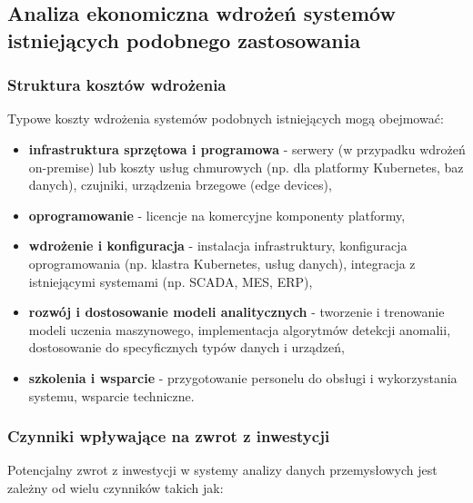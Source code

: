 \subsection{Analiza ekonomiczna wdrożeń systemów istniejących podobnego zastosowania}
\label{subsec:analiza_ekonomiczna}

\subsubsection{Struktura kosztów wdrożenia}
\label{subsubsec:struktura_kosztow}

Typowe koszty wdrożenia systemów podobnych istniejących mogą obejmować:

\begin{itemize}
    \item \textbf{infrastruktura sprzętowa i programowa} - serwery (w przypadku wdrożeń on-premise) lub koszty usług chmurowych (np. dla platformy Kubernetes, baz danych), czujniki, urządzenia brzegowe (edge devices),
    \item \textbf{oprogramowanie} - licencje na komercyjne komponenty platformy,
    \item \textbf{wdrożenie i konfiguracja} - instalacja infrastruktury, konfiguracja oprogramowania (np. klastra Kubernetes, usług danych), integracja z istniejącymi systemami (np. SCADA, MES, ERP),
    \item \textbf{rozwój i dostosowanie modeli analitycznych} - tworzenie i trenowanie modeli uczenia maszynowego, implementacja algorytmów detekcji anomalii, dostosowanie do specyficznych typów danych i urządzeń,
    \item \textbf{szkolenia i wsparcie} - przygotowanie personelu do obsługi i wykorzystania systemu, wsparcie techniczne.
\end{itemize}

\subsubsection{Czynniki wpływające na zwrot z inwestycji}
\label{subsubsec:analiza_roi}

Potencjalny zwrot z inwestycji w systemy analizy danych przemysłowych jest zależny od wielu czynników takich jak:

